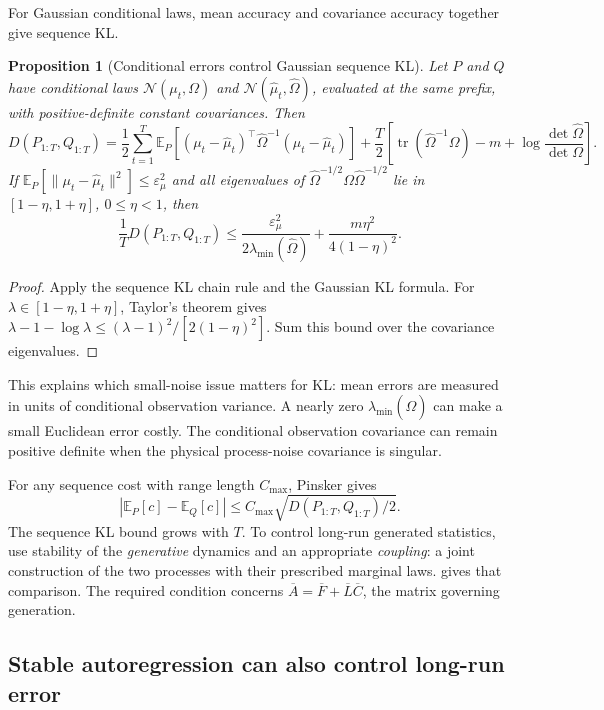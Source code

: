 \documentclass[11pt,twoside]{article}
\newcommand{\E}{\mathbb E}
\newcommand{\KL}{D}
\newtheorem{proposition}[theorem]{Proposition}
\theoremstyle{definition}
\theoremstyle{remark}
\begin{document}
For Gaussian conditional laws, mean accuracy and covariance accuracy
together give sequence KL.
\begin{proposition}[Conditional errors control Gaussian sequence KL]
\label{prop:gaussian-sequence-kl}
Let \(P\) and \(Q\) have conditional laws
\(\mathcal N(\mu_t,\Omega)\) and
\(\mathcal N(\widehat\mu_t,\widehat\Omega)\), evaluated at the same
prefix, with positive-definite constant covariances. Then
\[
 \KL(P_{1:T},Q_{1:T})
 =\frac12\sum_{t=1}^T\E_P[
   (\mu_t-\widehat\mu_t)^\top\widehat\Omega^{-1}
   (\mu_t-\widehat\mu_t)]
 +\frac T2\left[
 \operatorname{tr}(\widehat\Omega^{-1}\Omega)-m+
 \log\frac{\det\widehat\Omega}{\det\Omega}\right].
\]
If \(\E_P[\|\mu_t-\widehat\mu_t\|^2]\le\varepsilon_\mu^2\)
and all eigenvalues of
\(\widehat\Omega^{-1/2}\Omega\widehat\Omega^{-1/2}\)
lie in \([1-\eta,1+\eta]\), \(0\le\eta<1\), then
\begin{equation}
 \frac1T\KL(P_{1:T},Q_{1:T})
 \le \frac{\varepsilon_\mu^2}{2\lambda_{\min}(\widehat\Omega)}
       +\frac{m\eta^2}{4(1-\eta)^2}.
 \label{eq:gaussian-kl-bound}
\end{equation}
\end{proposition}
\begin{proof}
Apply the sequence KL chain rule and the Gaussian KL formula.
For \(\lambda\in[1-\eta,1+\eta]\), Taylor's theorem gives
\(\lambda-1-\log\lambda\le(\lambda-1)^2/[2(1-\eta)^2]\).
Sum this bound over the covariance eigenvalues.
\end{proof}

This explains which small-noise issue matters for KL:
mean errors are measured in units of conditional observation variance.
A nearly zero \(\lambda_{\min}(\widehat\Omega)\) can make a small
Euclidean error costly. The conditional observation covariance can remain
positive definite when the physical process-noise covariance is singular.

For any sequence cost with range length \(C_{\max}\), Pinsker gives
\[
 |\E_P[c]-\E_Q[c]|
 \le C_{\max}\sqrt{\KL(P_{1:T},Q_{1:T})/2}.
\]
The sequence KL bound grows with \(T\). To control long-run generated statistics, use stability
of the \emph{generative} dynamics and an appropriate \emph{coupling}:
a joint construction of the two processes with their prescribed marginal laws.
 gives that comparison.
The required condition concerns \(\overline A=\overline F+\overline L\overline C\),
the matrix governing generation.

\subsection{Stable autoregression can also control long-run error}
\label{sec:stable-ar}
\end{document}
